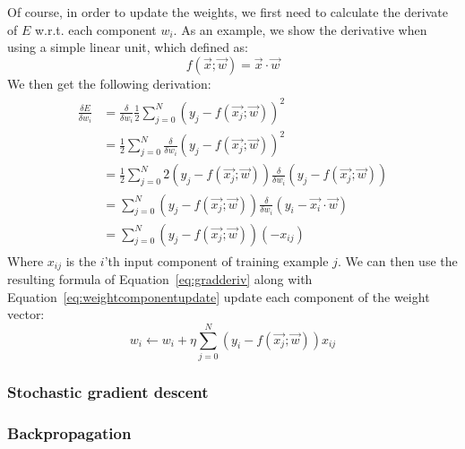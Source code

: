 Of course, in order to update the weights, we first need to calculate the derivate of $E$ w.r.t. each component $w_i$. As an example, we show the derivative when using a simple linear unit, which defined as:
\begin{equation}
    f(\overrightarrow{x};\overrightarrow{w}) = \overrightarrow{x} \cdot \overrightarrow{w}
\end{equation}
We then get the following derivation:
\begin{align}
    \label{eq:gradderiv}
    \begin{split}
        \frac{\delta E}{\delta w_i} &= \frac{\delta}{\delta w_i} \frac{1}{2} \sum_{j=0}^N (y_j - f(\overrightarrow{x_j};\overrightarrow{w}))^2\\
        &= \frac{1}{2} \sum_{j=0}^N \frac{\delta}{\delta w_i} (y_j - f(\overrightarrow{x_j};\overrightarrow{w}))^2\\
        &= \frac{1}{2} \sum_{j=0}^N 2 (y_j - f(\overrightarrow{x_j};\overrightarrow{w})) \frac{\delta}{\delta w_i} (y_j - f(\overrightarrow{x_j};\overrightarrow{w}))\\
        &= \sum_{j=0}^N (y_j - f(\overrightarrow{x_j};\overrightarrow{w})) \frac{\delta}{\delta w_i} (y_i - \overrightarrow{x_i} \cdot \overrightarrow{w})\\
        &= \sum_{j=0}^N (y_j - f(\overrightarrow{x_j};\overrightarrow{w}))(-x_{ij})
    \end{split}
\end{align}
Where $x_{ij}$ is the $i$'th input component of training example $j$. We can then use the resulting formula of Equation~\ref{eq:gradderiv} along with Equation~\ref{eq:weightcomponentupdate} update each component of the weight vector:
\begin{equation}
    w_i \gets w_i + \eta \sum_{j=0}^N (y_i - f(\overrightarrow{x_j};\overrightarrow{w}))x_{ij}
\end{equation}

\subsubsection{Stochastic gradient descent} %
\label{ssub:stochastic_gradient_descent}


\subsubsection{Backpropagation} %
\label{ssub:backpropagation}


